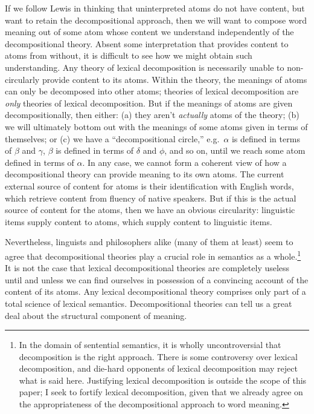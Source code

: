 If we follow Lewis in thinking that uninterpreted atoms do not have content, but want to retain the decompositional approach, then we will want to compose word meaning out of some atom whose content we understand independently of the decompositional theory. Absent some interpretation that provides content to atoms from without, it is difficult to see how we might obtain such understanding. Any theory of lexical decomposition is necessarily unable to non-circularly provide content to its atoms. Within the theory, the meanings of atoms can only be decomposed into other atoms; theories of lexical decomposition are \emph{only} theories of lexical decomposition. But if the meanings of atoms are given decompositionally, then either: (a) they aren't \emph{actually} atoms of the theory; (b) we will ultimately bottom out with the meanings of some atoms given in terms of themselves; or (c) we have a ``decompositional circle,'' e.g.\ $\alpha$ is defined in terms of $\beta$ and $\gamma$, $\beta$ is defined in terms of $\delta$ and $\phi$, and so on, until we reach some atom defined in terms of $\alpha$. In any case, we cannot form a coherent view of how a decompositional theory can provide meaning to its own atoms. The current external source of content for atoms is their identification with English words, which retrieve content from fluency of native speakers. But if this is the actual source of content for the atoms, then we have an obvious circularity: linguistic items supply content to atoms, which supply content to linguistic items.

Nevertheless, linguists and philosophers alike (many of them at least) seem to agree that decompositional theories play a crucial role in semantics as a whole.\footnote{In the domain of sentential semantics, it is wholly uncontroversial that decomposition is the right approach. There is some controversy over lexical decomposition, and die-hard opponents of lexical decomposition may reject what is said here. Justifying lexical decomposition is outside the scope of this paper; I seek to fortify lexical decomposition, given that we already agree on the appropriateness of the decompositional approach to word meaning.} It is not the case that lexical decompositional theories are completely useless until and unless we can find ourselves in possession of a convincing account of the content of its atoms. Any lexical decompositional theory comprises only part of a total science of lexical semantics. Decompositional theories can tell us a great deal about the structural component of meaning.

